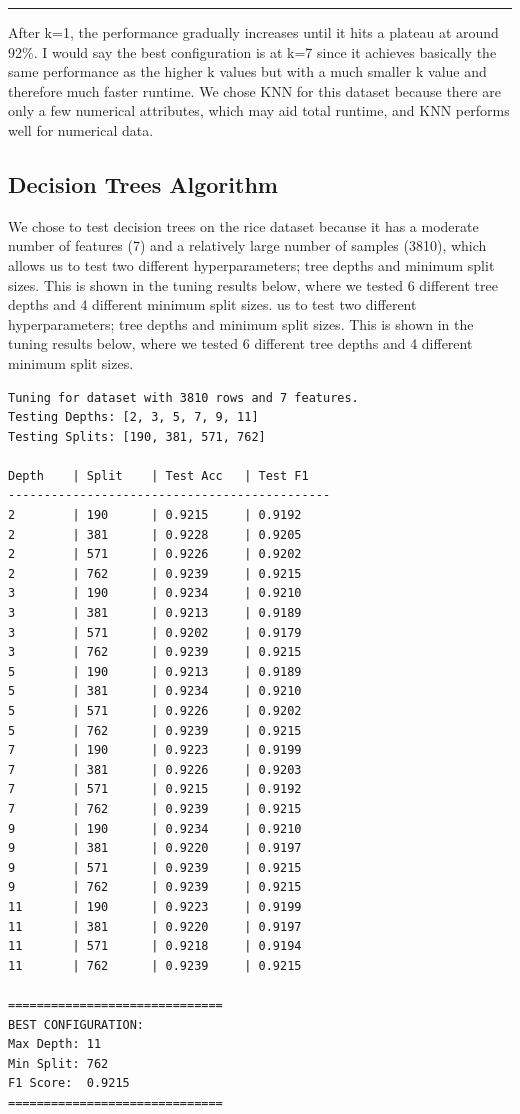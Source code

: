 \documentclass{article}
\begin{document}
\noindent\rule{\textwidth}{0.5pt}

After k=1, the performance gradually increases until it hits a plateau at around 92\%. I would say the best configuration is at k=7 since it achieves basically the same performance as the higher k values but with a much smaller k value and therefore much faster runtime. We chose KNN for this dataset because there are only a few numerical attributes, which may aid total runtime, and KNN performs well for numerical data. 

\subsection{Decision Trees Algorithm}
We chose to test decision trees on the rice dataset 
because it has a moderate number of features (7) and a 
relatively large number of samples (3810), which allows 
us to test two different hyperparameters; tree depths and 
minimum split sizes. This is shown in the tuning results below, 
where we tested 6 different tree depths and 4 different minimum split sizes.
us to test two different hyperparameters; tree depths and 
minimum split sizes. This is shown in the tuning results below, 
where we tested 6 different tree depths and 4 different minimum split sizes.

\begin{verbatim}
Tuning for dataset with 3810 rows and 7 features.
Testing Depths: [2, 3, 5, 7, 9, 11]
Testing Splits: [190, 381, 571, 762]

Depth    | Split    | Test Acc   | Test F1   
---------------------------------------------
2        | 190      | 0.9215     | 0.9192
2        | 381      | 0.9228     | 0.9205
2        | 571      | 0.9226     | 0.9202
2        | 762      | 0.9239     | 0.9215
3        | 190      | 0.9234     | 0.9210
3        | 381      | 0.9213     | 0.9189
3        | 571      | 0.9202     | 0.9179
3        | 762      | 0.9239     | 0.9215
5        | 190      | 0.9213     | 0.9189
5        | 381      | 0.9234     | 0.9210
5        | 571      | 0.9226     | 0.9202
5        | 762      | 0.9239     | 0.9215
7        | 190      | 0.9223     | 0.9199
7        | 381      | 0.9226     | 0.9203
7        | 571      | 0.9215     | 0.9192
7        | 762      | 0.9239     | 0.9215
9        | 190      | 0.9234     | 0.9210
9        | 381      | 0.9220     | 0.9197
9        | 571      | 0.9239     | 0.9215
9        | 762      | 0.9239     | 0.9215
11       | 190      | 0.9223     | 0.9199
11       | 381      | 0.9220     | 0.9197
11       | 571      | 0.9218     | 0.9194
11       | 762      | 0.9239     | 0.9215

==============================
BEST CONFIGURATION:
Max Depth: 11
Min Split: 762
F1 Score:  0.9215
==============================

\end{verbatim}
\end{document}

